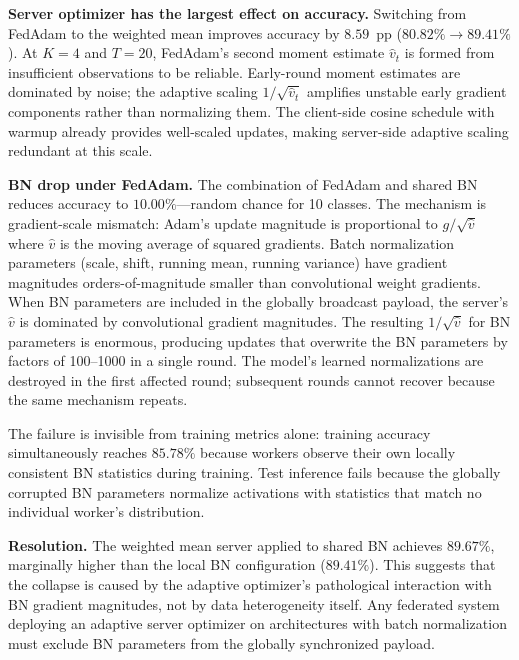 \documentclass[journal,twoside]{IEEEtran}
\begin{document}
\textbf{Server optimizer has the largest effect on accuracy.} Switching from FedAdam
to the weighted mean improves accuracy by $8.59$~pp ($80.82\%
\to 89.41\%$). At $K=4$ and $T=20$, FedAdam's second moment estimate
$\hat{v}_t$ is formed from insufficient observations to be reliable.
Early-round moment estimates are dominated by noise; the adaptive
scaling $1/\sqrt{\hat{v}_t}$ amplifies unstable early gradient
components rather than normalizing them. The client-side cosine
schedule with warmup already provides well-scaled updates, making
server-side adaptive scaling redundant at this scale.

\textbf{BN drop under FedAdam.} The combination of FedAdam and
shared BN reduces accuracy to $10.00\%$---random chance for 10 classes.
The mechanism is gradient-scale mismatch: Adam's update magnitude is
proportional to $g/\sqrt{\hat{v}}$ where $\hat{v}$ is the moving
average of squared gradients. Batch normalization parameters (scale,
shift, running mean, running variance) have gradient magnitudes
orders-of-magnitude smaller than convolutional weight gradients.
When BN parameters are included in the globally broadcast payload,
the server's $\hat{v}$ is dominated by convolutional gradient magnitudes.
The resulting $1/\sqrt{\hat{v}}$ for BN parameters is enormous,
producing updates that overwrite the BN parameters by factors of
100--1000 in a single round. The model's learned normalizations are
destroyed in the first affected round; subsequent rounds cannot recover
because the same mechanism repeats.

The failure is invisible from training metrics alone: training accuracy
simultaneously reaches $85.78\%$ because workers observe their own
locally consistent BN statistics during training. Test inference fails
because the globally corrupted BN parameters normalize activations with
statistics that match no individual worker's distribution.

\textbf{Resolution.} The weighted mean server applied to shared BN
achieves $89.67\%$, marginally higher than the local BN configuration
($89.41\%$). This suggests that the collapse is caused by the adaptive
optimizer's pathological interaction with BN gradient magnitudes, not
by data heterogeneity itself. Any federated system deploying an adaptive
server optimizer on architectures with batch normalization must exclude
BN parameters from the globally synchronized payload.
\end{document}
